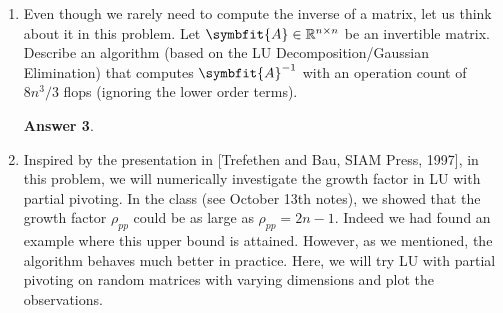 \documentclass{article}
\theoremstyle{definition}
\newtheorem*{answer}{Answer}
\newcommand{\reals}{\mathbb{R}}
\newcommand{\mat}[1]{\symbfit{#1}}
\begin{document}
\begin{enumerate}[leftmargin=\labelsep]
\begin{enumerate}
\begin{answer}
\begin{proof}
\begin{itemize}
\begin{align*}
						                  \hat{\mat{A}} & = \mat{U}_1\mat{L}_1,           \\
						                  \shortintertext{which exist by assumption, we have}
						                  \mat{A}       & = \mqty[\mat{U}_1     & \vec{l} \\\vec{0}^\top&1]\mqty[\mat{L}_1&\vec{0}\\\vec{c}^\top&\alpha_{nn}],
					                  \end{align*}
					                  where \(\vec{l} = \vec{a} / \alpha_{nn}\). Note, then that \(0 \neq \det(\mat{A}) = \det(\mat{L}_1) \alpha_{nn}\), so \(\alpha_{nn} \neq 0\), and the lower triangular matrix is nonsingular.
				            \end{itemize}
			            \end{proof}
		            \end{answer}

		      \item Write a Matlab code to implement the UL decomposition and apply it to
		            \[
			            \mqty[1&0&2&1\\-4&5&3&-1\\-1&3&1&1\\0&2&0&1]
		            \]
		            to verify that your code generates the required decomposition \(\mat{A} = \mat{U}\mat{L}\).
		            \begin{answer}
		            \end{answer}
	      \end{enumerate}

	\item Even though we rarely need to compute the inverse of a matrix, let us think about it in this problem. Let \(\mat{A} \in \reals^{n\times n}\) be an invertible matrix. Describe an algorithm (based on the LU Decomposition/Gaussian Elimination) that computes \(\mat{A}^{-1}\) with an operation count of \(8n^3/3\) flops (ignoring the lower order terms).
	      \begin{answer}
	      \end{answer}

	\item Inspired by the presentation in [Trefethen and Bau, SIAM Press, 1997], in this problem, we will numerically investigate the growth factor in LU with partial pivoting. In the class (see October 13th notes), we showed that the growth factor \(\rho_{pp}\) could be as large as \(\rho_{pp} = 2n-1\). Indeed we had found an example where this upper bound is attained. However, as we mentioned, the algorithm behaves much better in practice. Here, we will try LU with partial pivoting on random matrices with varying dimensions and plot the observations.


\end{enumerate}
\end{document}
